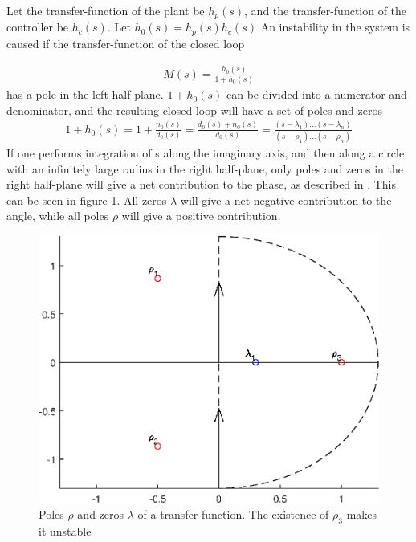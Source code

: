 Let the transfer-function of the plant be $h_p(s)$, and the transfer-function of the controller be $h_c(s)$. Let $h_0(s) = h_p(s) h_c(s)$ An instability in the system is caused if the transfer-function of the closed loop 

\begin{align}
    M(s) = \frac{h_0(s)}{1 + h_0(s)}
\end{align}
has a pole in the left half-plane. $1+ h_0(s)$ can be divided into a numerator and denominator, and the resulting closed-loop will have a set of poles and zeros 
\begin{align}
    1+ h_0(s) = 1 + \frac{n_0(s)}{d_0(s)} = \frac{d_0(s) + n_0(s)}{d_0(s)} = \frac{(s -\lambda_1) \dots ( s -\lambda_n)}{(s-\rho_1)\dots (s-\rho_n)}
\end{align}
If one performs integration of s along the imaginary axis, and then along a circle with an infinitely large radius in the right half-plane, only poles and zeros in the right half-plane will give a net contribution to the phase, as described in \cite{Regtek_boken}. This can be seen in figure \ref{fig:Nyquist_criteria}. All zeros $\lambda$ will give a net negative contribution to the angle, while all poles $\rho$ will give a positive contribution. 



\begin{figure}[h!]
    \includegraphics[width=\textwidth]{img/Fig_dump/Nyquist_criterion.eps}
    \caption{Poles $\rho$ and zeros $\lambda$ of a transfer-function. The existence of $\rho_3$ makes it unstable}
    \label{fig:Nyquist_criteria}
  \end{figure}

